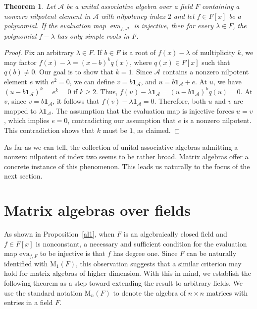 \documentclass{amsart}
\newtheorem{theorem}{Theorem}[section]
\theoremstyle{definition}
\begin{document}
	\begin{theorem}\label{inj poly}
		Let $\mathcal{A}$ be a unital associative algebra over a field $F$ containing a nonzero nilpotent element in $\mathcal{A}$ with nilpotency index \(2\) and let $f \in F[x]$ be a polynomial. If the evaluation map $\operatorname{eva}_{f, \mathcal{A}}$ is injective, then for every $\lambda \in F$, the polynomial $f - \lambda$ has only simple roots in $F$.
	\end{theorem}
	
	\begin{proof}
		Fix an arbitrary \(\lambda \in F\). If \(b \in F\) is a root of \(f(x) - \lambda\) of multiplicity \(k\), we may factor $f(x) - \lambda = (x - b)^k q(x)$,	where $q(x)\in F[x]$ such that \(q(b) \neq 0\). Our goal is to show that \(k = 1\). Since \(\mathcal{A}\) contains a nonzero nilpotent element \(e\) with \(e^2 = 0\), we can define
		$v = b  \mathbf{1}_{\mathcal{A}}$, and  $u = b \mathbf{1}_{\mathcal{A}} + e$. At \(u\), we have \((u - b  \mathbf{1}_{\mathcal{A}})^k = e^k = 0\) if \(k \ge 2\). Thus,
		$f(u) - \lambda  \mathbf{1}_{\mathcal{A}} = (u - b  \mathbf{1}_{\mathcal{A}})^k q(u) = 0.$ At \(v\), since \(v = b  \mathbf{1}_{\mathcal{A}}\), it follows that
		$f(v) - \lambda  \mathbf{1}_{\mathcal{A}} = 0.$ Therefore, both \(u\) and \(v\) are mapped to \(\lambda \mathbf{1}_{\mathcal{A}}\). The assumption that the evaluation map is injective forces \(u = v\), which implies \(e = 0\), contradicting our assumption that \(e\) is a nonzero nilpotent. This contradiction shows that \(k\) must be \(1\), as claimed.
	\end{proof}
	
	As far as we can tell, the collection of unital associative algebras admitting a nonzero nilpotent of index two seems to be rather broad. Matrix algebras offer a concrete instance of this phenomenon. This leads us naturally to the focus of the next section.   
	
	
	
	
	\section{Matrix algebras over fields}\label{matrix section}
	
	As shown in Proposition~\ref{al1}, when \( F \) is an algebraically closed field and \( f \in F[x] \) is nonconstant, a necessary and sufficient condition for the evaluation map \( \mathrm{eva}_{f,F} \) to be injective is that \( f \) has degree one. Since \( F \) can be naturally identified with \( \mathrm{M}_1(F) \), this observation suggests that a similar criterion may hold for matrix algebras of higher dimension. With this in mind, we establish the following theorem as a step toward extending the result to arbitrary fields. We use the standard notation \( \mathrm{M}_n(F) \) to denote the algebra of \( n \times n \) matrices with entries in a field \( F \).
	
\end{document}
